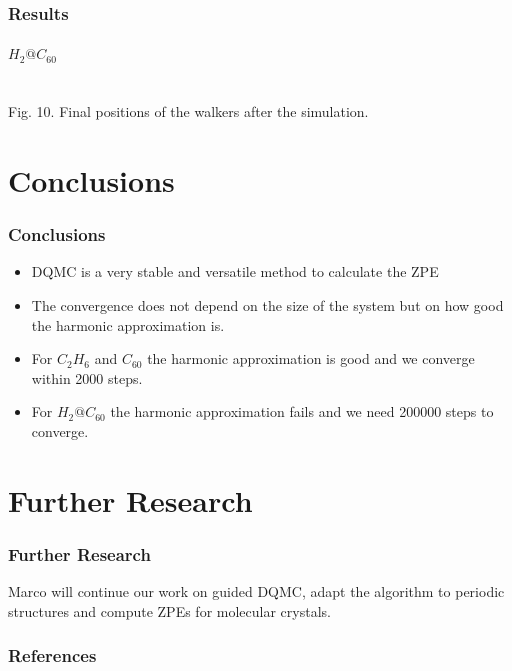 \documentclass[16pt]{beamer}
\begin{document}
\begin{frame}
\frametitle{Results}
\framesubtitle{$H_2@C_{60}$}
\begin{center}
\\
Fig. 10. Final positions of the walkers after the simulation.
\end{center}
\end{frame}

\section{Conclusions}
\begin{frame}
\frametitle{Conclusions}
\begin{itemize}
\item DQMC is a very stable and versatile method to calculate the ZPE
\item The convergence does not depend on the size of the system but on how good the harmonic approximation is. 
\item For $C_2H_6$ and $C_{60}$ the harmonic approximation is good and we converge within 2000 steps.
\item For $H_2@C_{60}$ the harmonic approximation fails and we need 200000 steps to converge. 
\end{itemize}
\end{frame}

\section{Further Research}
\begin{frame}
\frametitle{Further Research}
Marco will continue our work on guided DQMC, adapt the algorithm to periodic structures and compute ZPEs for molecular crystals.
\end{frame}


\begin{frame}
\frametitle{References}

\begin{scriptsize}

\end{scriptsize}
\end{frame}
\end{document}
